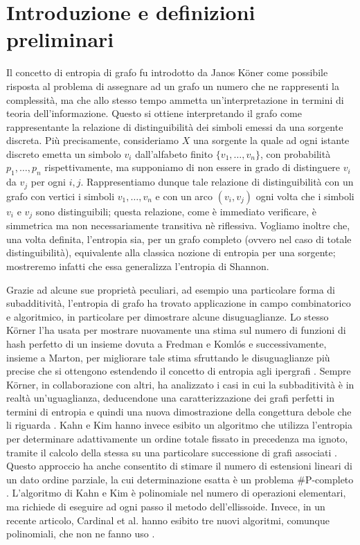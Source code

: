 \chapter{Introduzione e definizioni preliminari}
Il concetto di entropia di grafo fu introdotto da Janos K\"oner come possibile risposta al problema di assegnare ad un grafo un numero che ne rappresenti la complessità, ma che allo stesso tempo ammetta un'interpretazione in termini di teoria dell'informazione. \cite{Korner1973}
Questo si ottiene interpretando il grafo come rappresentante la relazione di distinguibilità dei simboli emessi da una sorgente discreta. Più precisamente, consideriamo $X$ una sorgente la quale ad ogni istante discreto emetta un simbolo $v_i$ dall'alfabeto finito $\{v_1,\dots,v_n\}$, con probabilità $p_1,\dots,p_n$ rispettivamente, ma supponiamo di non essere in grado di distinguere $v_i$ da $v_j$ per ogni $i,j$. Rappresentiamo dunque tale relazione di distinguibilità con un grafo con vertici i simboli $v_1,\dots,v_n$ e con un arco $(v_i,v_j)$ ogni volta che i simboli $v_i$ e $v_j$ sono distinguibili; questa relazione, come è immediato verificare, è simmetrica ma non necessariamente transitiva nè riflessiva. 
Vogliamo inoltre che, una volta definita, l'entropia sia, per un grafo completo (ovvero nel caso di totale distinguibilità), equivalente alla classica nozione di entropia per una sorgente; mostreremo infatti che essa generalizza l'entropia di Shannon.

Grazie ad alcune sue proprietà peculiari, ad esempio una particolare forma di subadditività, l'entropia di grafo ha trovato applicazione in campo combinatorico e algoritmico, in particolare per dimostrare alcune disuguaglianze.
Lo stesso K\"orner l'ha usata per mostrare nuovamente una stima sul numero di funzioni di hash perfetto di un insieme dovuta a Fredman e Koml\'os \cite{Korner1986} e successivamente, insieme a Marton, per migliorare tale stima sfruttando le disuguaglianze più precise che si ottengono estendendo il concetto di entropia agli ipergrafi \cite{Korner1990}. 
Sempre K\"orner, in collaborazione con altri, ha analizzato i casi in cui la subbaditività è in realtà un'uguaglianza, deducendone una caratterizzazione dei grafi perfetti in termini di entropia e quindi una nuova dimostrazione della congettura debole che li riguarda \cite{Csiszar1990}.
Kahn e Kim hanno invece esibito un algoritmo che utilizza l'entropia per determinare adattivamente un ordine totale fissato in precedenza ma ignoto, tramite il calcolo della stessa su una particolare successione di grafi associati \cite{Kahn1995}. Questo approccio ha anche consentito di stimare il numero di estensioni lineari di un dato ordine parziale, la cui determinazione esatta è un problema \#P-completo \cite{Brightwell1991}. L'algoritmo di Kahn e Kim \`e polinomiale nel numero di operazioni elementari, ma richiede di eseguire ad ogni passo il metodo dell'ellissoide. Invece, in un recente articolo, Cardinal et al. hanno esibito tre nuovi algoritmi, comunque polinomiali, che non ne fanno uso \cite{Cardinal2010}.

